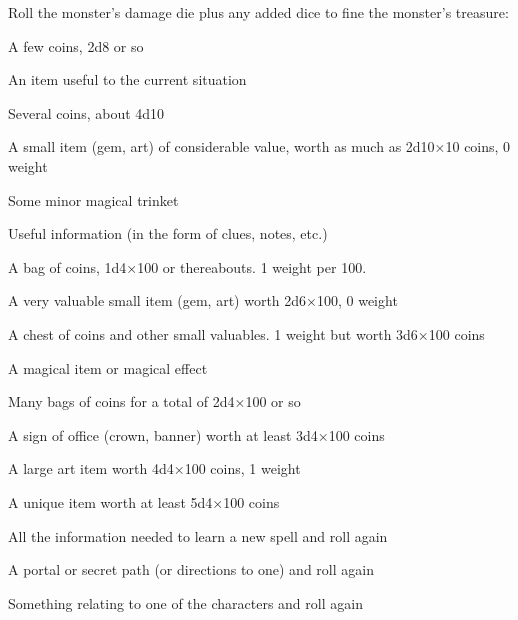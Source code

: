 Roll the monster's damage die plus any added dice to fine the monster's treasure:

       
\startitemize[n,packed]
         
\item A few coins, 2d8 or so

         
\item An item useful to the current situation

         
\item Several coins, about 4d10

         
\item A small item (gem, art) of considerable value, worth as much as 2d10×10 coins, 0 weight

         
\item Some minor magical trinket

         
\item Useful information (in the form of clues, notes, etc.)

         
\item A bag of coins, 1d4×100 or thereabouts. 1 weight per 100.

         
\item A very valuable small item (gem, art) worth 2d6×100, 0 weight

         
\item A chest of coins and other small valuables. 1 weight but worth 3d6×100 coins

         
\item A magical item or magical effect

         
\item Many bags of coins for a total of 2d4×100 or so

         
\item A sign of office (crown, banner) worth at least 3d4×100 coins

         
\item A large art item worth 4d4×100 coins, 1 weight

         
\item A unique item worth at least 5d4×100 coins

         
\item All the information needed to learn a new spell and roll again

         
\item A portal or secret path (or directions to one) and roll again

         
\item Something relating to one of the characters and roll again

